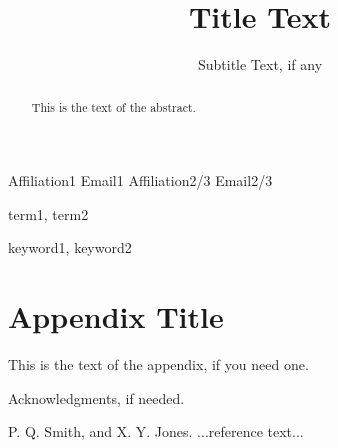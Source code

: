 \documentclass[10pt,preprint]{sigplanconf}
\begin{document}
\setlength{\pdfpageheight}{\paperheight}
\setlength{\pdfpagewidth}{\paperwidth}




\title{Title Text}
\subtitle{Subtitle Text, if any}

           {Affiliation1}
           {Email1}
           {Affiliation2/3}
           {Email2/3}

\maketitle

\begin{abstract}
This is the text of the abstract.
\end{abstract}


\terms
term1, term2

\keywords
keyword1, keyword2





\appendix
\section{Appendix Title}

This is the text of the appendix, if you need one.

\acks

Acknowledgments, if needed.





\begin{thebibliography}{}
\softraggedright

P. Q. Smith, and X. Y. Jones. ...reference text...

\end{thebibliography}
\end{document}
